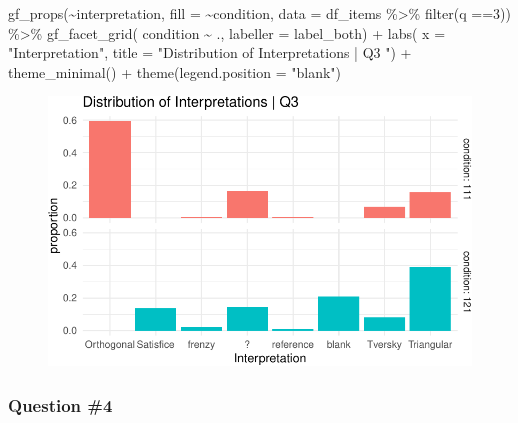 \documentclass[
  letterpaper,
  DIV=11,
  numbers=noendperiod]{scrreprt}
\newenvironment{Shaded}{\begin{snugshade}}{\end{snugshade}}
\newcommand{\AttributeTok}[1]{\textcolor[rgb]{0.40,0.45,0.13}{#1}}
\newcommand{\DecValTok}[1]{\textcolor[rgb]{0.68,0.00,0.00}{#1}}
\newcommand{\FunctionTok}[1]{\textcolor[rgb]{0.28,0.35,0.67}{#1}}
\newcommand{\NormalTok}[1]{\textcolor[rgb]{0.00,0.23,0.31}{#1}}
\newcommand{\SpecialCharTok}[1]{\textcolor[rgb]{0.37,0.37,0.37}{#1}}
\newcommand{\StringTok}[1]{\textcolor[rgb]{0.13,0.47,0.30}{#1}}
\begin{document}
\begin{Shaded}
\begin{Highlighting}[]
\FunctionTok{gf\_props}\NormalTok{(}\SpecialCharTok{\textasciitilde{}}\NormalTok{interpretation, }\AttributeTok{fill =} \SpecialCharTok{\textasciitilde{}}\NormalTok{condition, }\AttributeTok{data =}\NormalTok{ df\_items }\SpecialCharTok{\%\textgreater{}\%} \FunctionTok{filter}\NormalTok{(q }\SpecialCharTok{==}\DecValTok{3}\NormalTok{)) }\SpecialCharTok{\%\textgreater{}\%} 
  \FunctionTok{gf\_facet\_grid}\NormalTok{( condition }\SpecialCharTok{\textasciitilde{}}\NormalTok{ ., }\AttributeTok{labeller =}\NormalTok{ label\_both) }\SpecialCharTok{+} 
  \FunctionTok{labs}\NormalTok{( }\AttributeTok{x =} \StringTok{"Interpretation"}\NormalTok{, }\AttributeTok{title =} \StringTok{"Distribution of Interpretations | Q3 "}\NormalTok{) }\SpecialCharTok{+} 
  \FunctionTok{theme\_minimal}\NormalTok{() }\SpecialCharTok{+} \FunctionTok{theme}\NormalTok{(}\AttributeTok{legend.position =} \StringTok{"blank"}\NormalTok{)}
\end{Highlighting}
\end{Shaded}

\begin{figure}[H]

{\centering \includegraphics{analysis/SGC3A/2_sgc3A_scoring_files/figure-pdf/Q3-distribution-2.pdf}

}

\end{figure}

\hypertarget{question-4}{%
\subsubsection{Question \#4}\label{question-4}}
\end{document}
